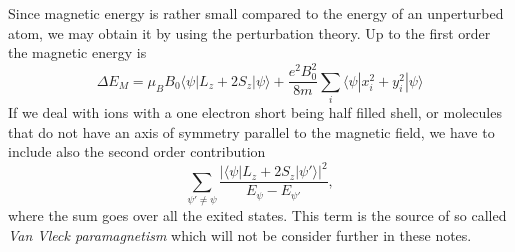 Since magnetic energy is rather small compared to the energy of an unperturbed atom, we may obtain it by using the perturbation theory. Up to the first order the magnetic energy is
\begin{equation}\label{eq:E_magnetic}
\Delta E_M = \mu_B B_0 \langle \psi | L_z + 2 S_z | \psi \rangle 
+ \frac{e^2 B_0^2}{8 m}\sum_i \langle \psi | x_i^2 + y_i^2 | \psi \rangle
\end{equation} 
If we deal with ions with a one electron short being half filled shell, or molecules that do not have an axis of symmetry parallel to the magnetic field, we have to include also the second order contribution
\begin{equation}
\sum_{\psi' \neq \psi} \frac{|\langle \psi | L_z + 2 S_z | \psi' \rangle|^2}{E_\psi - E_{\psi'}},
\end{equation}
where the sum goes over all the exited states. This term is the source of so called \emph{Van Vleck paramagnetism} which will not be consider further in these notes.

